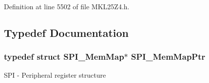Definition at line 5502 of file M\+K\+L25\+Z4.\+h.



\subsection{Typedef Documentation}
\subsubsection[{\texorpdfstring{S\+P\+I\+\_\+\+Mem\+Map\+Ptr}{SPI_MemMapPtr}}]{\setlength{\rightskip}{0pt plus 5cm}typedef struct {\bf S\+P\+I\+\_\+\+Mem\+Map}$\ast$ {\bf S\+P\+I\+\_\+\+Mem\+Map\+Ptr}}\hypertarget{group___s_p_i___peripheral_ga7e4e9921e4d56bdbb10a04e77743ff5e}{}\label{group___s_p_i___peripheral_ga7e4e9921e4d56bdbb10a04e77743ff5e}
S\+PI -\/ Peripheral register structure 